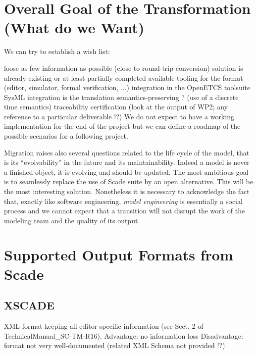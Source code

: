\documentclass{template/openetcs_report}
\begin{document}

\chapter{Overall Goal of the Transformation (What do we Want)}
\label{cha:over-goal-transf}

We can try to establish a wish list:

loose as few information as possible (close to round-trip conversion)
solution is already existing or at least partially completed
available tooling for the format (editor, simulator, formal verification, ...)
integration in the OpenETCS toolsuite
SysML integration
is the translation semantics-preserving ? (use of a discrete time semantics)
traceability
certification (look at the output of WP2; any reference to a particular deliverable !?)
We do not expect to have a working implementation for the end of the project but we can define a roadmap of the possible scenarios for a following project.

Migration raises also several questions related to the life cycle of
the model, that is its ``evolvability'' in the future and its
maintainability. Indeed a model is never a finished object, it is
evolving and should be updated. The most ambitious goal is to
seamlessly replace the use of Scade suite by an open alternative. This
will be the most interesting solution. Nonetheless it is necessary to
acknowledge the fact that, exactly like software engineering,
\emph{model engineering} is essentially a social process and we cannot
expect that a transition will not disrupt the work of the modeling
team and the quality of its output.


\chapter{Supported Output Formats from Scade}
\label{cha:supp-outp-form}

\section{XSCADE}

XML format keeping all editor-specific information (see Sect. 2 of
TechnicalManual\_SC-TM-R16).  Advantage: no information loss
Disadvantage: format not very well-documented (related XML Schema not
provided !?)
\end{document}
